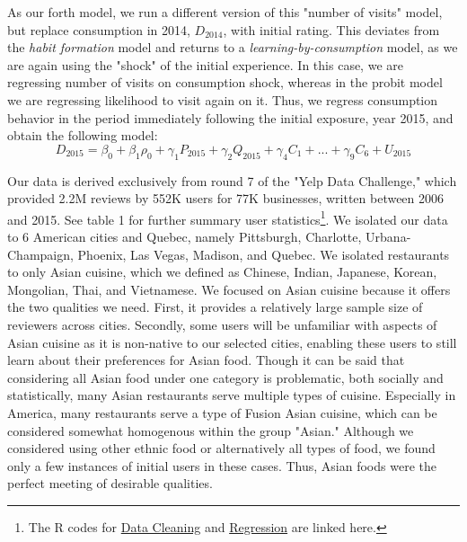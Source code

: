 \documentclass[Journal,letterpaper, NoLineNumbers]{ascelike-new}
\begin{document}
As our forth model, we run a different version of this "number of visits" model, but replace consumption in 2014, $D_{2014}$, with initial rating. This deviates from the \textit{habit formation} model and returns to a \textit{learning-by-consumption} model, as we are again using the "shock" of the initial experience. In this case, we are regressing number of visits on consumption shock, whereas in the probit model we are regressing likelihood to visit again on it. Thus, we regress consumption behavior in the period immediately following the initial exposure, year 2015, and obtain the following model: 
\begin{equation}
D_{2015} = \beta_0 + \beta_1\rho_0 + \gamma_1P_{2015} + \gamma_2Q_{2015} +  \gamma_4C_1 + ... + \gamma_9C_6 + U_{2015}
\end{equation}

Our data is derived exclusively from round 7 of the "Yelp Data Challenge," which provided 2.2M reviews by 552K users for 77K businesses, written between 2006 and 2015. See table 1 for further summary user statistics\footnote{The R codes for \href{https://gist.github.com/anonymous/052c65ac01943dafe782415f2ce10e61}{Data Cleaning} and \href{https://gist.github.com/anonymous/0e4b6a6b6dd88b0e0c6e55794226ee07}{Regression} are linked here.}. We isolated our data to 6 American cities and Quebec, namely Pittsburgh, Charlotte, Urbana-Champaign, Phoenix, Las Vegas, Madison, and Quebec. We isolated restaurants to only Asian cuisine, which we defined as Chinese, Indian, Japanese, Korean, Mongolian, Thai, and Vietnamese. We focused on Asian cuisine because it offers the two qualities we need. First, it provides a relatively large sample size of reviewers across cities. Secondly, some users will be unfamiliar with aspects of Asian cuisine as it is non-native to our selected cities, enabling these users to still learn about their preferences for Asian food. Though it can be said that considering all Asian food under one category is problematic, both socially and statistically, many Asian restaurants serve multiple types of cuisine. Especially in America, many restaurants serve a type of Fusion Asian cuisine, which can be considered somewhat homogenous within the group "Asian." Although we considered using other ethnic food or alternatively all types of food, we found only a few instances of initial users in these cases. Thus, Asian foods were the perfect meeting of desirable qualities. 
\end{document}

